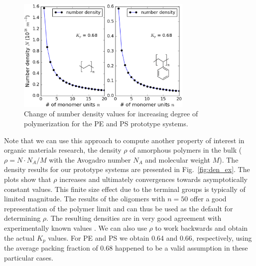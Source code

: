 \begin{figure}[htbp] 
	\centering
	\includegraphics[width=0.75\textwidth]{Chapter-2/Figures/plot_numden.eps}
	\caption{Change of number density values for increasing degree of polymerization for the PE and PS prototype systems.} 
	\label{fig:nden_ex} 
\end{figure} 


Note that we can use this approach to compute another property of interest in organic materials research, \ie  the density $\rho$ of amorphous polymers in the bulk (\via\ $\rho = N \cdot N_A / M$ with the Avogadro number $N_A$ and molecular weight $M$). The density results for our prototype systems are presented in Fig.\ \ref{fig:den_ex}. 
The plots show that $\rho$ increases and ultimately convergences towards asymptotically constant values. This finite size effect due to the terminal groups is typically of limited magnitude. 
The results of the oligomers with $n=50$ offer a good representation of the polymer limit and can thus be used as the default for determining $\rho$. The resulting densities are in very good agreement with experimentally known values \cite{Bicerano2002}. 
We can also use $\rho$ to work backwards and obtain the actual $K_p$ values. For PE and PS we obtain 0.64 and 0.66, respectively, \ie  using the average packing fraction of 0.68 happened to be a valid assumption in these particular cases.


